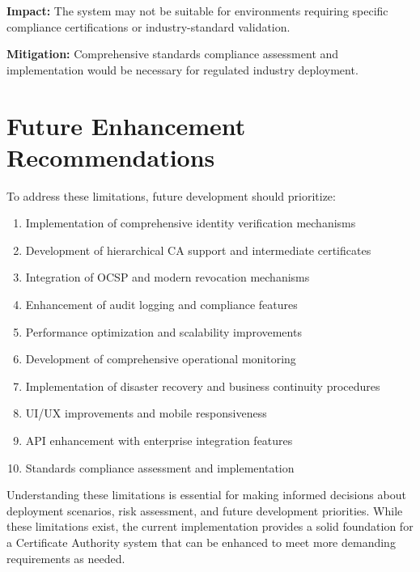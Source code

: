 \textbf{Impact:} The system may not be suitable for environments requiring specific compliance certifications or industry-standard validation.

\textbf{Mitigation:} Comprehensive standards compliance assessment and implementation would be necessary for regulated industry deployment.

\section{Future Enhancement Recommendations}

To address these limitations, future development should prioritize:

\begin{enumerate}
    \item Implementation of comprehensive identity verification mechanisms
    \item Development of hierarchical CA support and intermediate certificates
    \item Integration of OCSP and modern revocation mechanisms
    \item Enhancement of audit logging and compliance features
    \item Performance optimization and scalability improvements
    \item Development of comprehensive operational monitoring
    \item Implementation of disaster recovery and business continuity procedures
    \item UI/UX improvements and mobile responsiveness
    \item API enhancement with enterprise integration features
    \item Standards compliance assessment and implementation
\end{enumerate}

Understanding these limitations is essential for making informed decisions about deployment scenarios, risk assessment, and future development priorities. While these limitations exist, the current implementation provides a solid foundation for a Certificate Authority system that can be enhanced to meet more demanding requirements as needed.